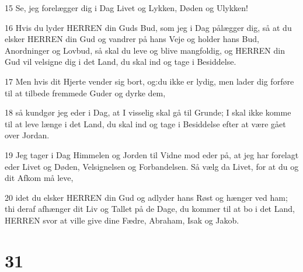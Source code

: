 \par 15 Se, jeg forelægger dig i Dag Livet og Lykken, Døden og Ulykken!
\par 16 Hvis du lyder HERREN din Guds Bud, som jeg i Dag pålægger dig, så at du elsker HERREN din Gud og vandrer på hans Veje og holder hans Bud, Anordninger og Lovbud, så skal du leve og blive mangfoldig, og HERREN din Gud vil velsigne dig i det Land, du skal ind og tage i Besiddelse.
\par 17 Men hvis dit Hjerte vender sig bort, og:du ikke er lydig, men lader dig forføre til at tilbede fremmede Guder og dyrke dem,
\par 18 så kundgør jeg eder i Dag, at I visselig skal gå til Grunde; I skal ikke komme til at leve længe i det Land, du skal ind og tage i Besiddelse efter at være gået over Jordan.
\par 19 Jeg tager i Dag Himmelen og Jorden til Vidne mod eder på, at jeg har forelagt eder Livet og Døden, Velsignelsen og Forbandelsen. Så vælg da Livet, for at du og dit Afkom må leve,
\par 20 idet du elsker HERREN din Gud og adlyder hans Røst og hænger ved ham; thi deraf afhænger dit Liv og Tallet på de Dage, du kommer til at bo i det Land, HERREN svor at ville give dine Fædre, Abraham, Isak og Jakob.

\chapter{31}

